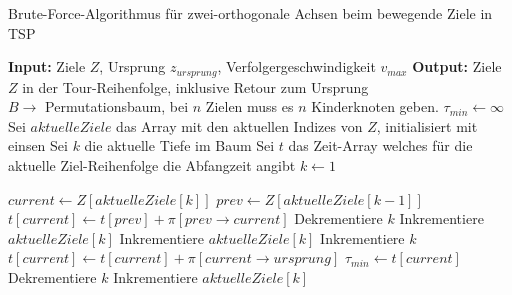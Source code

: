 \documentclass[german,version-2019-11]{uzl-thesis}
\begin{document}
\begin{minipage}{1\linewidth}
\begin{algorithm}[H]
\begin{algorithmic}
\caption{Brute-Force-Algorithmus für zwei-orthogonale Achsen beim bewegende Ziele in TSP}
\label{alg:BF}
\State \textbf{Input:} Ziele $Z$, Ursprung $z_{ursprung}$, Verfolgergeschwindigkeit $v_{max}$
\State \textbf{Output:} Ziele $Z$ in der Tour-Reihenfolge, inklusive Retour zum Ursprung\\

\State $B\rightarrow$ Permutationsbaum, bei $n$ Zielen muss es $n$ Kinderknoten geben.
\State $\tau_{min}\leftarrow \infty$
\State Sei $aktuelleZiele$ das Array mit den aktuellen Indizes von $Z$, initialisiert mit einsen
\State Sei $k$ die aktuelle Tiefe im Baum
\State Sei $t$ das Zeit-Array welches für die aktuelle Ziel-Reihenfolge die Abfangzeit angibt
\State $k\leftarrow 1$

\State $current\leftarrow Z[aktuelleZiele[k]]$
\State $prev\leftarrow Z[aktuelleZiele[k-1]]$
\State $t[current] \leftarrow t[prev] + \pi[prev\rightarrow current]$
\State Dekrementiere $k$
\State Inkrementiere $aktuelleZiele[k]$
\Else
\State Inkrementiere $aktuelleZiele[k]$ 
\EndIf
\Else
{}
\State Inkrementiere $k$
\Else
\State $t[current]\leftarrow t[current] + \pi[current\rightarrow ursprung]$ 
\State $\tau_{min}\leftarrow t[current]$
\State Dekrementiere $k$
\State Inkrementiere $aktuelleZiele[k]$
\EndIf 
\EndIf
\EndIf
\EndWhile
\end{algorithmic}
\end{algorithm}
\end{minipage}
\end{document}
